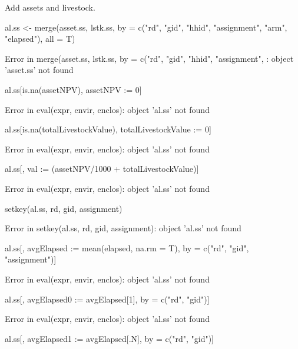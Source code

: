 Add assets and livestock.
\begin{Schunk}
\begin{Sinput}
al.ss <- merge(asset.ss, lstk.ss, 
	by = c("rd", "gid", "hhid", "assignment", "arm", "elapsed"), all = T)
\end{Sinput}
\begin{Soutput}
Error in merge(asset.ss, lstk.ss, by = c("rd", "gid", "hhid", "assignment", : object 'asset.ss' not found
\end{Soutput}
\begin{Sinput}
al.ss[is.na(assetNPV), assetNPV := 0]
\end{Sinput}
\begin{Soutput}
Error in eval(expr, envir, enclos): object 'al.ss' not found
\end{Soutput}
\begin{Sinput}
al.ss[is.na(totalLivestockValue), totalLivestockValue := 0]
\end{Sinput}
\begin{Soutput}
Error in eval(expr, envir, enclos): object 'al.ss' not found
\end{Soutput}
\begin{Sinput}
al.ss[, val := (assetNPV/1000 + totalLivestockValue)]
\end{Sinput}
\begin{Soutput}
Error in eval(expr, envir, enclos): object 'al.ss' not found
\end{Soutput}
\begin{Sinput}
setkey(al.ss, rd, gid, assignment)
\end{Sinput}
\begin{Soutput}
Error in setkey(al.ss, rd, gid, assignment): object 'al.ss' not found
\end{Soutput}
\begin{Sinput}
al.ss[, avgElapsed := mean(elapsed, na.rm = T), by = c("rd", "gid", "assignment")]
\end{Sinput}
\begin{Soutput}
Error in eval(expr, envir, enclos): object 'al.ss' not found
\end{Soutput}
\begin{Sinput}
al.ss[, avgElapsed0 := avgElapsed[1], by = c("rd", "gid")]
\end{Sinput}
\begin{Soutput}
Error in eval(expr, envir, enclos): object 'al.ss' not found
\end{Soutput}
\begin{Sinput}
al.ss[, avgElapsed1 := avgElapsed[.N], by = c("rd", "gid")]

\end{Sinput}
\end{Schunk}
